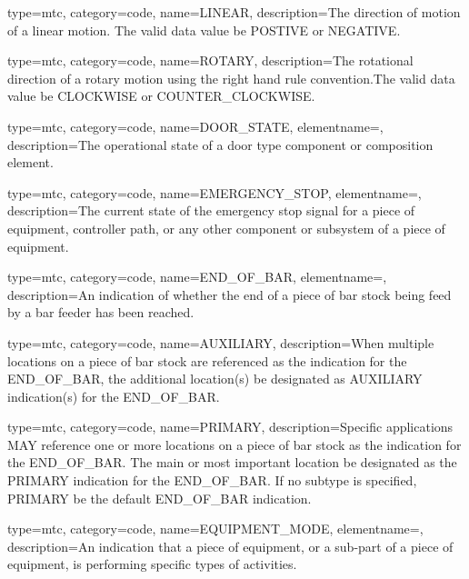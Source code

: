 {
  type=mtc,
  category=code,
  name={LINEAR},
  description={The direction of motion of a linear motion.   The \gls{valid data value} \must be POSTIVE or NEGATIVE.}
}

{
  type=mtc,
  category=code,
  name={ROTARY},
  description={The rotational direction of a rotary motion using the right hand rule convention.The \gls{valid data value} \must be CLOCKWISE or COUNTER\_CLOCKWISE.}
}

{
  type=mtc,
  category=code,
  name={DOOR\_STATE},
  elementname=,
  description={The operational state of a \gls{door} type component or composition element.}
}

{
  type=mtc,
  category=code,
  name={EMERGENCY\_STOP},
  elementname=,
  description={The current state of the emergency stop signal for a piece of equipment, controller path, or any other component or subsystem of a piece of equipment.}
}

{
  type=mtc,
  category=code,
  name={END\_OF\_BAR},
  elementname=,
  description={An indication of whether the end of a piece of bar stock being feed by a bar feeder has been reached.}
}

{
  type=mtc,
  category=code,
  name={AUXILIARY},
  description={When multiple locations on a piece of bar stock are referenced as the indication for the END\_OF\_BAR, the additional location(s) \must be designated as AUXILIARY indication(s) for the END\_OF\_BAR.  }
}

{
  type=mtc,
  category=code,
  name={PRIMARY},
  description={Specific applications MAY reference one or more locations on a piece of bar stock as the indication for the END\_OF\_BAR.  The main or most important location \must be designated as the PRIMARY indication for the END\_OF\_BAR.   \newline If no \gls{subtype} is specified, PRIMARY \must be the default END\_OF\_BAR indication.}
}

{
  type=mtc,
  category=code,
  name={EQUIPMENT\_MODE},
  elementname=,
  description={An indication that a piece of equipment, or a sub-part of a piece of equipment, is performing specific types of activities.}
}

